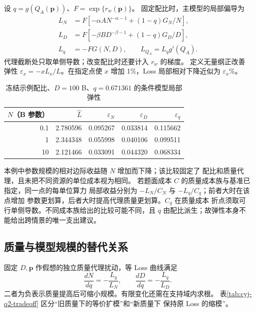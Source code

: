 设 $q=g(Q_A(\boldsymbol p))$、$F=\exp\{r_w(\boldsymbol p)\}$。
固定配比时，主模型的局部偏导为
\begin{align}\label{eq:cyj-derivatives}
L_N&=F[-\alpha AN^{-\alpha-1}+(1-q)G_N/N],\\
L_D&=F[-\beta BD^{-\beta-1}+(1-q)G_D/D],\\
L_q&=-FG(N,D),\qquad L_{Q_A}=L_qg'(Q_A).
\end{align}
代理截断处只取单侧导数；改变配比时还要计入 $r_w$ 的梯度。
定义无量纲正改善弹性 $\varepsilon_x=-xL_x/L$。在指定点使
$x$ 增加 1\%，Loss 局部相对下降近似为 $\varepsilon_x$\%。

\begin{table}[htbp]
\centering\small
\caption{冻结示例配比、$D=100$ B、$q=0.671361$ 的条件模型局部弹性}
\label{tab:cyj-q2-elasticity}
\begin{tabular}{rrrrr}
\hline
$N$（B 参数） & $\widehat L$ & $\varepsilon_N$ & $\varepsilon_D$ & $\varepsilon_q$\\ \hline
0.1 & 2.780596 & 0.095267 & 0.033814 & 0.115662\\
1 & 2.344348 & 0.055998 & 0.040106 & 0.099511\\
10 & 2.121466 & 0.033091 & 0.044320 & 0.068334\\ \hline
\end{tabular}
\end{table}

本例中参数规模的相对边际收益随 $N$ 增加而下降；该比较固定了
配比和质量代理，且未把不同资源的单位成本视为相同。
若题面成本 $C$ 的质量成本族与基准已指定，同一点的每单位算力
局部收益分别为 $-L_N/C_N$ 与 $-L_q/C_q$；前者大时在该点增加
参数更划算，后者大时提高代理质量更划算。$C_q$ 在质量成本
折点须取可行单侧导数。不同成本族给出的比较可能不同，且
$q$ 由配比派生；故弹性本身不能给出跨情景的唯一支出建议。

\subsection{质量与模型规模的替代关系}

固定 $D,\boldsymbol p$ 作假想的独立质量代理扰动，等 Loss 曲线满足
\begin{equation}\label{eq:cyj-tradeoff}
\frac{dN}{dq}=-\frac{L_q}{L_N},\qquad
\frac{dD}{dq}=-\frac{L_q}{L_D}.
\end{equation}
二者为负表示质量提高后可缩小规模。有限变化还需在支持域内求根。
表\ref{tab:cyj-q2-tradeoff} 区分“旧质量下的等价扩模”和“新质量下
保持原 Loss 的缩模”。

